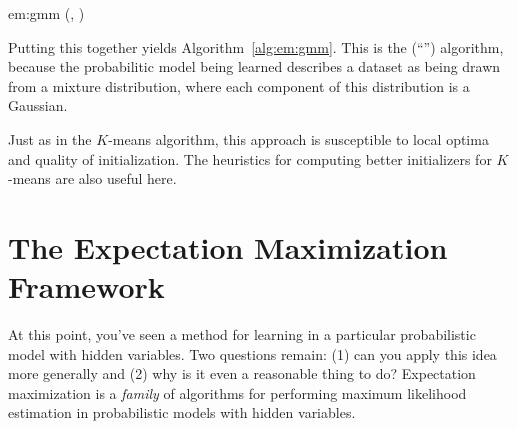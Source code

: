\newalgorithm%
  {em:gmm}%
  {(, )}
  {
 
 
 
\ENDFOR
\REPEAT
{}
\ENDFOR
{}
\ENDFOR
{}
\ENDFOR
{}
\RETURN {} 
}

Putting this together yields Algorithm~\ref{alg:em:gmm}.  This is the
 (``'') algorithm,
because the probabilitic model being learned describes a dataset as
being drawn from a mixture distribution, where each component of this
distribution is a Gaussian.


Just as in the $K$-means algorithm, this approach is susceptible to
local optima and quality of initialization.  The heuristics for
computing better initializers for $K$-means are also useful here.

\section{The Expectation Maximization Framework}

At this point, you've seen a method for learning in a particular
probabilistic model with hidden variables.  Two questions remain: (1)
can you apply this idea more generally and (2) why is it even a
reasonable thing to do?  Expectation maximization is a \emph{family}
of algorithms for performing maximum likelihood estimation in
probabilistic models with hidden variables.

